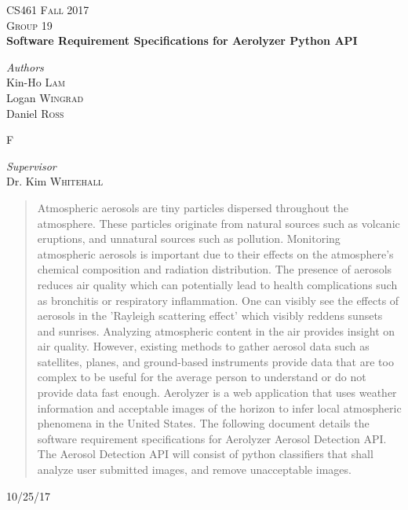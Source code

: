 \documentclass[journal,10pt,draftclsnofoot,onecolumn]{IEEEtran}
\begin{document}
\begin{titlepage}
\newcommand{\HRule}{\rule{\linewidth}{0.4mm}}

\center

\textsc{\Large CS461 Fall 2017 }\\[0.5cm]
\textsc{\large Group 19}\\[0.5cm] %

{\huge\bfseries Software Requirement Specifications for Aerolyzer Python API}\\[0.4cm]

\vfill
\begin{minipage}{0.4\textwidth}
\begin{flushleft}
\large
\textit{Authors}\\
Kin-Ho \textsc{Lam}\\
Logan \textsc{Wingrad}\\
Daniel \textsc{Ross}\\
\end{flushleft}F
\end{minipage}
\vfill
\begin{minipage}{0.4\textwidth}
\begin{flushleft}
\large
\textit{Supervisor}\\
Dr. Kim \textsc{Whitehall}
\end{flushleft}
\end{minipage}

\vfill

\begin{abstract}
Atmospheric aerosols are tiny particles dispersed throughout the atmosphere.
These particles originate from natural sources such as volcanic eruptions, and unnatural sources such as pollution. 
Monitoring atmospheric aerosols is important due to their effects on the atmosphere's chemical composition and radiation distribution.
The presence of aerosols reduces air quality which can potentially lead to health complications such as bronchitis or respiratory inflammation.
One can visibly see the effects of aerosols in the 'Rayleigh scattering effect' which visibly reddens sunsets and sunrises.
Analyzing atmospheric content in the air provides insight on air quality. 
However, existing methods to gather aerosol data such as satellites, planes, and ground-based instruments provide data that are too complex to be useful for the average person to understand or do not provide data fast enough.
Aerolyzer is a web application that uses weather information and acceptable images of the horizon to infer local atmospheric phenomena in the United States. 
The following document details the software requirement specifications for Aerolyzer Aerosol Detection API. The Aerosol Detection API will consist of  python classifiers that shall analyze user submitted images, and remove unacceptable images.
\end{abstract}

\vfill
\vfill
\vfill
{\large10/25/17}
\vfill
\end{titlepage}
\end{document}
